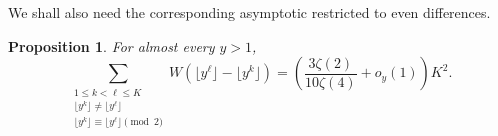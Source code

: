 \documentclass[11pt,reqno]{amsart}
\numberwithin{equation}{section}
\newtheorem{proposition}[theorem]{Proposition}
\begin{document}
    We shall also need the corresponding asymptotic restricted to even differences.

    \begin{proposition}\label{prop-metric-even}
        For almost every $y>1$,
        \begin{equation}\label{eq-even-pair-asymptotic}
            \sum_{\substack{1\le k<\ell\le K\\
                    \lfloor y^k\rfloor\ne\lfloor y^\ell\rfloor\\
                    \lfloor y^k\rfloor\equiv\lfloor y^\ell\rfloor\pmod2}}
            W\!\left(\lfloor y^\ell\rfloor-\lfloor y^k\rfloor\right)
            =\left(\frac{3\zeta(2)}{10\zeta(4)}+o_y(1)\right)K^2.
        \end{equation}
    \end{proposition}
\end{document}
